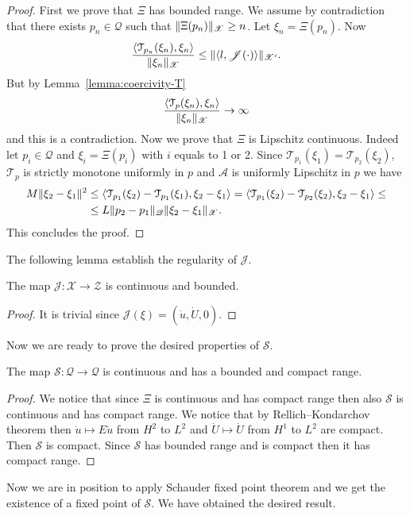 \begin{proof}
First we prove that $\Xi$ has bounded range. We assume by contradiction that there exists $p_n\in\mathscr{Q}$ such that $\lVert\Xi(p_n)\rVert_\mathscr{X}\ge n$. Let $\xi_n=\Xi(p_n)$. Now
\[
\frac{\langle\mathcal{T}_{p_n}(\xi_n),\xi_n\rangle}{\lVert\xi_n\rVert_\mathscr{X}}\le\lVert\langle l,\mathscr{J}(\cdot)\rangle\rVert_{\mathscr{X}'}.
\]
But by Lemma~\ref{lemma:coercivity-T}
\[
\frac{\langle\mathcal{T}_p(\xi_n),\xi_n\rangle}{\lVert\xi_n\rVert_\mathscr{X}}\to\infty
\]
and this is a contradiction. Now we prove that $\Xi$ is Lipschitz continuous. Indeed let $p_i\in\mathscr{Q}$ and $\xi_i=\Xi(p_i)$ with $i$ equals to 1 or 2. Since $\mathcal{T}_{p_1}(\xi_1)=\mathcal{T}_{p_2}(\xi_2)$, $\mathcal{T}_p$ is strictly monotone uniformly in $p$ and $\mathcal{A}$ is uniformly Lipschitz in $p$ we have
\[
\begin{split}
M\lVert\xi_2-\xi_1\rVert^2&\le\langle\mathcal{T}_{p_1}(\xi_2)-\mathcal{T}_{p_1}(\xi_1),\xi_2-\xi_1\rangle=\langle\mathcal{T}_{p_1}(\xi_2)-\mathcal{T}_{p_2}(\xi_2),\xi_2-\xi_1\rangle\le\\
&\le L\lVert p_2-p_1\rVert_\mathscr{Q}\lVert\xi_2-\xi_1\rVert_\mathscr{X}.
\end{split}
\]
This concludes the proof.
\end{proof}
The following lemma establish the regularity of $\mathcal{J}$.
\begin{lemma}
\label{lemma:J-regularity}
The map $\mathscr{J}\colon\mathscr{X}\to\mathscr{Z}$ is continuous and bounded.
\end{lemma}
\begin{proof}
It is trivial since $\mathcal{J}(\xi)=(\dot u,\dot U,0)$.
\end{proof}
Now we are ready to prove the desired properties of $\mathcal{S}$.
\begin{lemma}
The map $\mathcal{S}\colon\mathscr{Q}\to\mathscr{Q}$ is continuous and has a bounded and compact range.
\end{lemma}
\begin{proof}
We notice that since $\Xi$ is continuous and has compact range then also $\mathcal{S}$ is continuous and has compact range. We notice that by Rellich--Kondarchov theorem then $\dot u\mapsto E\dot u$ from $H^2$ to $L^2$ and $\dot U\mapsto\dot U$ from $H^1$ to $L^2$ are compact. Then $\mathcal{S}$ is compact. Since $\mathcal{S}$ has bounded range and is compact then it has compact range.
\end{proof}
Now we are in position to apply Schauder fixed point theorem and we get the existence of a fixed point of $\mathcal{S}$. We have obtained the desired result.
